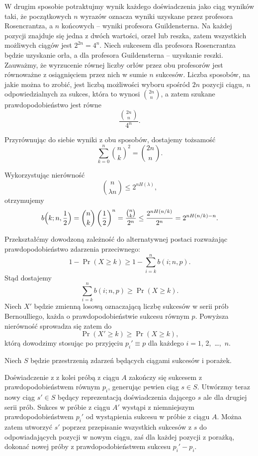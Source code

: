 W drugim sposobie potraktujmy wynik każdego doświadczenia jako  ciąg wyników taki, że początkowych $n$ wyrazów oznacza wyniki uzyskane przez profesora Rosencrantza, a $n$ końcowych -- wyniki profesora Guildensterna. Na każdej pozycji znajduje się jedna z dwóch wartości, orzeł lub reszka, zatem wszystkich możliwych ciągów jest $2^{2n}=4^n$. Niech sukcesem dla profesora Rosencrantza będzie uzyskanie orła, a dla profesora Guildensterna -- uzyskanie reszki. Zauważmy, że wyrzucenie równej liczby orłów przez obu profesorów jest równoważne z osiągnięciem przez nich w sumie $n$ sukcesów. Liczba sposobów, na jakie można to zrobić, jest liczbą możliwości wyboru spośród $2n$ pozycji ciągu, $n$ odpowiedzialnych za sukces, która to wynosi $\binom{2n}{n}$, a zatem szukane prawdopodobieństwo jest równe
\[
	\frac{\binom{2n}{n}}{4^n}.
\]

Przyrównując do siebie wyniki z obu sposobów, dostajemy tożsamość
\[
	\sum_{k=0}^n\binom{n}{k}^2 = \binom{2n}{n}.
\]

\exercise{} %
Wykorzystując nierówność
\[
	\binom{n}{\lambda n} \le 2^{nH(\lambda)},
\]
otrzymujemy
\[
	b\Bigl(k;n,\frac{1}{2}\Bigr) = \binom{n}{k}\left(\frac{1}{2}\right)^n = \frac{\binom{n}{k}}{2^n} \le \frac{2^{nH(n/k)}}{2^n} = 2^{nH(n/k)-n}.
\]

\exercise{} %
Przekształćmy dowodzoną zależność do alternatywnej postaci rozważając prawdopodobieństwo zdarzenia przeciwnego:
\[
    1-\Pr(X\ge k) \ge 1-\sum_{i=k}^nb(i;n,p).
\]
Stąd dostajemy
\[
    \sum_{i=k}^nb(i;n,p) \ge \Pr(X\ge k).
\]
Niech $X'$ będzie zmienną losową oznaczającą liczbę sukcesów w serii prób Bernoulliego, każda o prawdopodobieństwie sukcesu równym $p$. Powyższa nierówność sprowadza się zatem do
\[
    \Pr(X'\ge k) \ge \Pr(X\ge k),
\]
którą dowodzimy stosując  po przyjęciu $p_i'\equiv p$ dla każdego $i=1$, 2,~\dots,~$n$.

\exercise{} %
Niech $S$ będzie przestrzenią zdarzeń będących ciągami  sukcesów i porażek.

Doświadczenie z  z kolei próbą z ciągu $A$ zakończy się sukcesem z prawdopodobieństwem równym $p_i$, generując pewien ciąg $s\in S$. Utwórzmy teraz nowy ciąg $s'\in S$ będący reprezentacją doświadczenia dającego $s$ ale dla drugiej serii prób. Sukces w  próbie z ciągu $A'$ wystąpi z niemniejszym prawdopodobieństwem $p_i'$ od wystąpienia sukcesu w  próbie z ciągu $A$. Można zatem utworzyć $s'$ poprzez przepisanie wszystkich sukcesów z $s$ do odpowiadających pozycji w nowym ciągu, zaś dla każdej pozycji z porażką, dokonać nowej próby z prawdopodobieństwem sukcesu $p_i'-p_i$.

